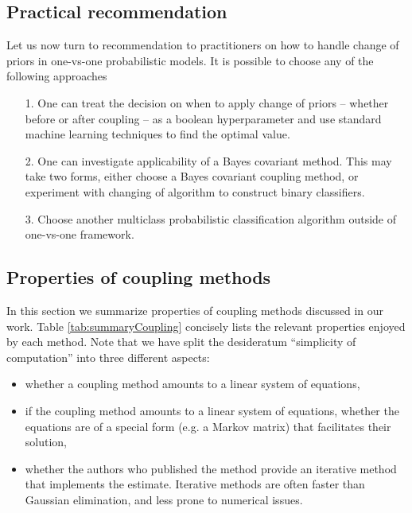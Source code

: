 \subsection{Practical recommendation}

Let us now turn to recommendation to practitioners on how to handle change of priors in one-vs-one probabilistic models. It is possible to choose any of the following approaches

\begin{itemize}
\item[1.] One can treat the decision on when to apply change of priors -- whether before or after coupling -- as a boolean hyperparameter and use standard machine learning techniques to find the optimal value.
\item[2.] One can investigate applicability of a Bayes covariant method. This may take two forms, either choose a Bayes covariant coupling method, or experiment with changing of algorithm to construct binary classifiers. 
\item[3.] Choose another multiclass probabilistic classification algorithm outside of one-vs-one framework. 
\end{itemize}


\subsection{Properties of coupling methods}

In this section  we summarize properties of coupling methods discussed in our work.  Table \ref{tab:summaryCoupling} concisely lists the relevant properties enjoyed by each method. Note that we have split the desideratum ``simplicity of computation'' into three different aspects:
\begin{itemize}
	\item whether a coupling method amounts to a linear system of equations,
	\item if the coupling method amounts to a linear system of equations, whether the equations are of a special form (e.g. a Markov matrix) that facilitates their solution,
	\item whether the authors who published the method provide an iterative method that implements the estimate. Iterative methods are often  faster than Gaussian elimination, and less prone to numerical issues.
\end{itemize}



